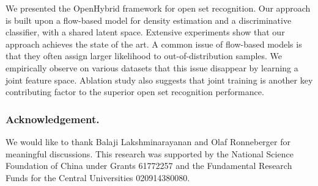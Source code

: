 \documentclass[runningheads]{llncs}
\begin{document}
We presented the OpenHybrid framework for open set recognition. Our approach is built upon a flow-based model for density estimation and a discriminative classifier, with a shared latent space. Extensive experiments show that our approach achieves the state of the art. A common issue of flow-based models is that they often assign larger likelihood to out-of-distribution samples. We empirically observe on various datasets that this issue disappear by learning a joint feature space. Ablation study also suggests that joint training is another key contributing factor to the superior open set recognition performance.

\subsubsection{Acknowledgement.}
We would like to thank Balaji Lakshminarayanan and Olaf Ronneberger for meaningful discussions. This research was supported by the National Science Foundation of China under Grants 61772257 and the Fundamental Research Funds for the Central Universities 020914380080.

\clearpage


\end{document}
